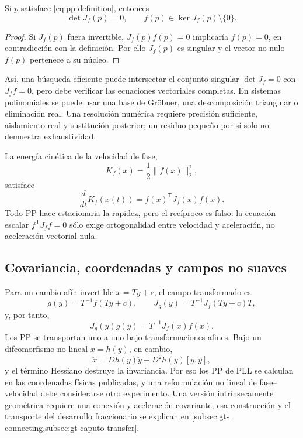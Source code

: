 \begin{proposition}
Si \(p\) satisface \cref{eq:pp-definition}, entonces
\begin{equation}
 \det J_f(p)=0,
 \qquad f(p)\in\ker J_f(p)\setminus\{0\}.
 \label{eq:pp-singular-screen}
\end{equation}
\end{proposition}

\begin{proof}
Si \(J_f(p)\) fuera invertible, \(J_f(p)f(p)=0\) implicaría \(f(p)=0\), en
contradicción con la definición. Por ello \(J_f(p)\) es singular y el vector
no nulo \(f(p)\) pertenece a su núcleo.
\end{proof}

Así, una búsqueda eficiente puede intersectar el conjunto singular
\(\det J_f=0\) con \(J_f f=0\), pero debe verificar las ecuaciones vectoriales
completas. En sistemas polinomiales se puede usar una base de Gröbner,
una descomposición triangular o eliminación real. Una resolución numérica
requiere precisión suficiente, aislamiento real y sustitución posterior;
un residuo pequeño por sí solo no demuestra exhaustividad.

La energía cinética de la velocidad de fase,
\begin{equation}
 K_f(x)=\frac12\|f(x)\|_2^2,
\end{equation}
satisface
\begin{equation}
 \frac{d}{dt}K_f(x(t))=f(x)^{\mathsf T}J_f(x)f(x).
 \label{eq:pp-speed-derivative}
\end{equation}
Todo PP hace estacionaria la rapidez, pero el recíproco es falso: la ecuación
escalar \(f^{\mathsf T}J_f f=0\) sólo exige ortogonalidad entre velocidad y
aceleración, no aceleración vectorial nula.

\subsection{Covariancia, coordenadas y campos no suaves}

Para un cambio afín invertible \(x=Ty+c\), el campo transformado es
\begin{equation}
 g(y)=T^{-1}f(Ty+c),\qquad J_g(y)=T^{-1}J_f(Ty+c)T,
\end{equation}
y, por tanto,
\begin{equation}
 J_g(y)g(y)=T^{-1}J_f(x)f(x).
 \label{eq:pp-affine-covariance}
\end{equation}
Los PP se transportan uno a uno bajo transformaciones afines. Bajo un
difeomorfismo no lineal \(x=h(y)\), en cambio,
\begin{equation}
 \ddot x=Dh(y)\ddot y+D^2h(y)[\dot y,\dot y],
 \label{eq:pp-nonlinear-coordinate}
\end{equation}
y el término Hessiano destruye la invariancia. Por eso los PP de PLL se
calculan en las coordenadas físicas publicadas, y una reformulación no lineal
de fase--velocidad debe considerarse otro experimento. Una versión
intrínsecamente geométrica requiere una conexión y aceleración covariante;
esa construcción y el transporte del desarrollo fraccionario se explican en
\cref{subsec:gt-connecting,subsec:gt-caputo-transfer}.

